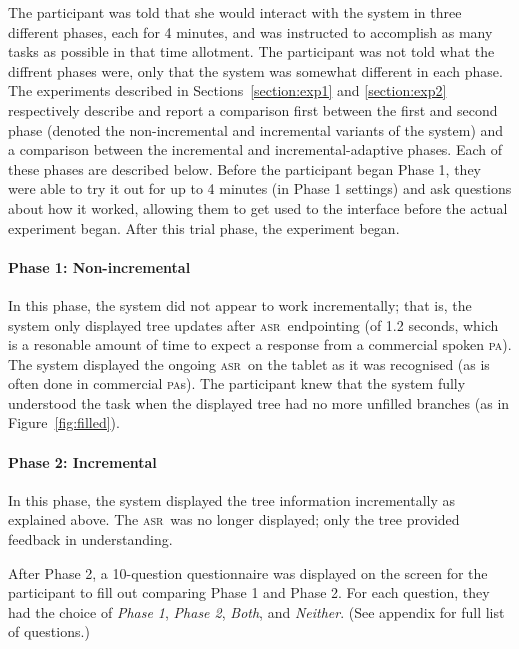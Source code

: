 \documentclass[11pt]{article}
\newcommand{\asr}[0]{\textsc{asr}}
\newcommand{\pa}[0]{\textsc{pa}}
\begin{document}
The participant was told that she would interact with the system in three different phases, each for 4 minutes, and was instructed to accomplish as many tasks as possible in that time allotment. The participant was not told what the diffrent phases were, only that the system was somewhat different in each phase. The experiments described in Sections~\ref{section:exp1} and \ref{section:exp2} respectively describe and report a comparison first between the first and second phase (denoted the non-incremental and incremental variants of the system) and a comparison between the incremental and incremental-adaptive phases. Each of these phases are described below. Before the participant began Phase 1, they were able to try it out for up to 4 minutes (in Phase 1 settings) and ask questions about how it worked, allowing them to get used to the interface before the actual experiment began. After this trial phase, the experiment began.

\paragraph{Phase 1: Non-incremental} In this phase, the system did not appear to work incrementally; that is, the system only displayed tree updates after \asr\ endpointing (of 1.2 seconds, which is a resonable amount of time to expect a response from a commercial spoken \pa). The system displayed the ongoing \asr\ on the tablet as it was recognised (as is often done in commercial \pa s). The participant knew that the system fully understood the task when the displayed tree had no more unfilled branches (as in Figure~\ref{fig:filled}). 

\paragraph{Phase 2: Incremental} In this phase, the system displayed the tree information incrementally as explained above. The \asr\ was no longer displayed; only the tree provided feedback in understanding. 

After Phase 2, a 10-question questionnaire was displayed on the screen for the participant to fill out comparing Phase 1 and Phase 2. For each question, they had the choice of \emph{Phase 1}, \emph{Phase 2}, \emph{Both}, and \emph{Neither}. (See appendix for full list of questions.) 
\end{document}
